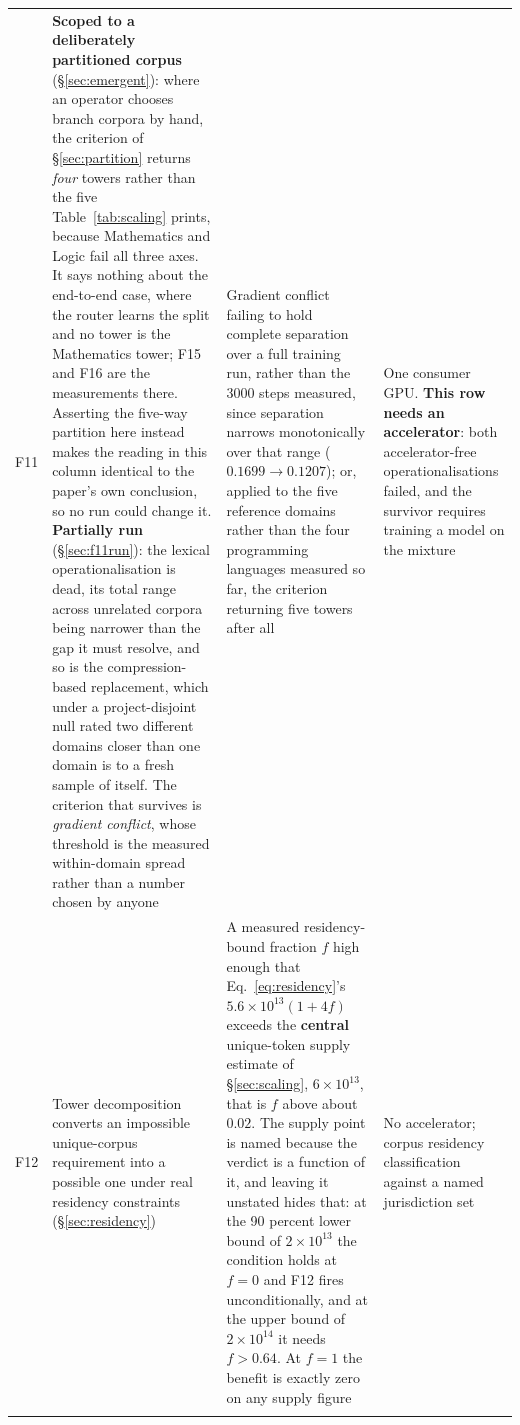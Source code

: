 \documentclass[11pt]{article}
\begin{document}
\begin{longtable}{@{}p{}p{}p{}p{}@{}}
F11 & \textbf{Scoped to a deliberately partitioned corpus} (\S\ref{sec:emergent}): where an operator chooses branch corpora by hand, the criterion of \S\ref{sec:partition} returns \emph{four} towers rather than the five Table~\ref{tab:scaling} prints, because Mathematics and Logic fail all three axes. It says nothing about the end-to-end case, where the router learns the split and no tower is the Mathematics tower; F15 and F16 are the measurements there. Asserting the five-way partition here instead makes the reading in this column identical to the paper's own conclusion, so no run could change it. \textbf{Partially run} (\S\ref{sec:f11run}): the lexical operationalisation is dead, its total range across unrelated corpora being narrower than the gap it must resolve, and so is the compression-based replacement, which under a project-disjoint null rated two different domains closer than one domain is to a fresh sample of itself. The criterion that survives is \emph{gradient conflict}, whose threshold is the measured within-domain spread rather than a number chosen by anyone & Gradient conflict failing to hold complete separation over a full training run, rather than the 3000 steps measured, since separation narrows monotonically over that range ($0.1699 \to 0.1207$); or, applied to the five reference domains rather than the four programming languages measured so far, the criterion returning five towers after all & One consumer GPU. \textbf{This row needs an accelerator}: both accelerator-free operationalisations failed, and the survivor requires training a model on the mixture \\
\addlinespace
F12 & Tower decomposition converts an impossible unique-corpus requirement into a possible one under real residency constraints (\S\ref{sec:residency}) & A measured residency-bound fraction $f$ high enough that Eq.~\eqref{eq:residency}'s $5.6\times10^{13}(1+4f)$ exceeds the \textbf{central} unique-token supply estimate of \S\ref{sec:scaling}, $6\times10^{13}$, that is $f$ above about $0.02$. The supply point is named because the verdict is a function of it, and leaving it unstated hides that: at the 90 percent lower bound of $2\times10^{13}$ the condition holds at $f=0$ and F12 fires unconditionally, and at the upper bound of $2\times10^{14}$ it needs $f > 0.64$. At $f=1$ the benefit is exactly zero on any supply figure & No accelerator; corpus residency classification against a named jurisdiction set \\
\addlinespace

\end{longtable}
\end{document}
